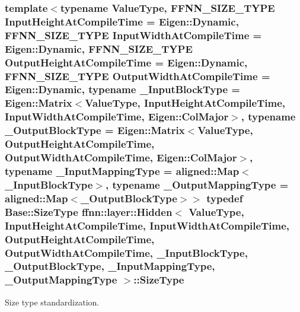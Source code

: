 \hypertarget{classffnn_1_1layer_1_1_hidden_a3deb1dc4b3a83b3d6749474debee025f}{
\subsubsection[{Size\-Type}]{\setlength{\rightskip}{0pt plus 5cm}template$<$typename Value\-Type, F\-F\-N\-N\-\_\-\-S\-I\-Z\-E\-\_\-\-T\-Y\-P\-E Input\-Height\-At\-Compile\-Time = Eigen\-::\-Dynamic, F\-F\-N\-N\-\_\-\-S\-I\-Z\-E\-\_\-\-T\-Y\-P\-E Input\-Width\-At\-Compile\-Time = Eigen\-::\-Dynamic, F\-F\-N\-N\-\_\-\-S\-I\-Z\-E\-\_\-\-T\-Y\-P\-E Output\-Height\-At\-Compile\-Time = Eigen\-::\-Dynamic, F\-F\-N\-N\-\_\-\-S\-I\-Z\-E\-\_\-\-T\-Y\-P\-E Output\-Width\-At\-Compile\-Time = Eigen\-::\-Dynamic, typename \-\_\-\-Input\-Block\-Type = Eigen\-::\-Matrix$<$\-Value\-Type, Input\-Height\-At\-Compile\-Time, Input\-Width\-At\-Compile\-Time, Eigen\-::\-Col\-Major$>$, typename \-\_\-\-Output\-Block\-Type = Eigen\-::\-Matrix$<$\-Value\-Type, Output\-Height\-At\-Compile\-Time, Output\-Width\-At\-Compile\-Time, Eigen\-::\-Col\-Major$>$, typename \-\_\-\-Input\-Mapping\-Type = aligned\-::\-Map$<$\-\_\-\-Input\-Block\-Type$>$, typename \-\_\-\-Output\-Mapping\-Type = aligned\-::\-Map$<$\-\_\-\-Output\-Block\-Type$>$$>$ typedef {\bf Base\-::\-Size\-Type} {\bf ffnn\-::layer\-::\-Hidden}$<$ Value\-Type, Input\-Height\-At\-Compile\-Time, Input\-Width\-At\-Compile\-Time, Output\-Height\-At\-Compile\-Time, Output\-Width\-At\-Compile\-Time, \-\_\-\-Input\-Block\-Type, \-\_\-\-Output\-Block\-Type, \-\_\-\-Input\-Mapping\-Type, \-\_\-\-Output\-Mapping\-Type $>$\-::{\bf Size\-Type}}}\label{classffnn_1_1layer_1_1_hidden_a3deb1dc4b3a83b3d6749474debee025f}


Size type standardization. 



